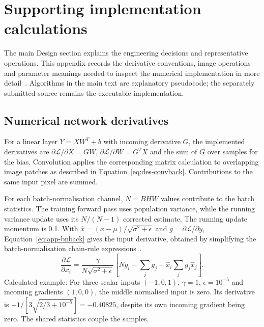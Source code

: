 \section{Supporting implementation calculations}
\label{app:des-implementation}
The main Design section explains the engineering decisions and representative operations. This appendix records the derivative conventions, image operations and parameter meanings needed to inspect the numerical implementation in more detail~\cite[\texttt{train.py}, \texttt{segment.py}, \texttt{style.py}]{braunepipeline2026}. Algorithms in the main text are explanatory pseudocode; the separately submitted source remains the executable implementation.

\subsection{Numerical network derivatives}
\label{app:des-derivatives}
For a linear layer $Y=XW^T+b$ with incoming derivative $G$, the implemented derivatives are $\partial\mathcal L/\partial X=GW$, $\partial\mathcal L/\partial W=G^TX$ and the sum of $G$ over samples for the bias. Convolution applies the corresponding matrix calculation to overlapping image patches as described in Equation~\ref{eq:des-convback}. Contributions to the same input pixel are summed.~\cite[train.py; segment.py; style.py]{braunepipeline2026}


For each batch-normalisation channel, $N=BHW$ values contribute to the batch statistics. The training forward pass uses population variance, while the running variance update uses its $N/(N-1)$ corrected estimate. The running update momentum is 0.1. With $\widehat x=(x-\mu)/\sqrt{\sigma^2+\epsilon}$ and $g=\partial\mathcal L/\partial y$, Equation~\ref{eq:app-bnback} gives the input derivative, obtained by simplifying the batch-normalisation chain-rule expressions~\cite[PDF p.~4]{ioffe2015}.
\begin{equation}
\frac{\partial\mathcal L}{\partial x_i}=
\frac{\gamma}{N\sqrt{\sigma^2+\epsilon}}
\left[Ng_i-\sum_jg_j-\widehat x_i\sum_jg_j\widehat x_j\right].
\label{eq:app-bnback}
\end{equation}
Calculated example: For three scalar inputs $(-1,0,1)$, $\gamma=1$, $\epsilon=10^{-5}$ and incoming gradients $(1,0,0)$, the middle normalised input is zero. Its derivative is $-1/[3\sqrt{2/3+10^{-5}}]=-0.40825$, despite its own incoming gradient being zero. The shared statistics couple the samples. \cite[train.py, BatchNorm2dBackward]{braunepipeline2026}

